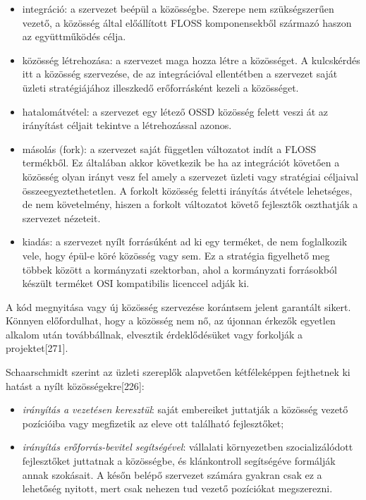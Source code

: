 \documentclass[12pt,magyar,a4paper,oneside]{scrreprt}
\providecommand{\tightlist}{%
  \setlength{\itemsep}{0pt}\setlength{\parskip}{0pt}}
\begin{document}
\begin{itemize}
\tightlist
\item
  integráció: a szervezet beépül a közösségbe. Szerepe nem
  szükségszerűen vezető, a közösség által előállított FLOSS
  komponensekből származó haszon az együttműködés célja.
\item
  közösség létrehozása: a szervezet maga hozza létre a közösséget. A
  kulcskérdés itt a közösség szervezése, de az integrációval ellentétben
  a szervezet saját üzleti stratégiájához illeszkedő erőforrásként
  kezeli a közösséget.
\item
  hatalomátvétel: a szervezet egy létező OSSD közösség felett veszi át
  az irányítást céljait tekintve a létrehozással azonos.
\item
  másolás (fork): a szervezet saját független változatot indít a FLOSS
  termékből. Ez általában akkor következik be ha az integrációt követően
  a közösség olyan irányt vesz fel amely a szervezet üzleti vagy
  stratégiai céljaival összeegyeztethetetlen. A forkolt közösség feletti
  irányítás átvétele lehetséges, de nem követelmény, hiszen a forkolt
  változatot követő fejlesztők oszthatják a szervezet nézeteit.
\item
  kiadás: a szervezet nyílt forrásúként ad ki egy terméket, de nem
  foglalkozik vele, hogy épül-e köré közösség vagy sem. Ez a stratégia
  figyelhető meg többek között a kormányzati szektorban, ahol a
  kormányzati forrásokból készült terméket OSI kompatibilis licenccel
  adják ki.
\end{itemize}

A kód megnyitása vagy új közösség szervezése korántsem jelent garantált
sikert. Könnyen előfordulhat, hogy a közösség nem nő, az újonnan érkezők
egyetlen alkalom után továbbállnak, elvesztik érdeklődésüket vagy
forkolják a projektet{[}271{]}.

Schaarschmidt szerint az üzleti szereplők alapvetően kétféleképpen
fejthetnek ki hatást a nyílt közösségekre{[}226{]}:

\begin{itemize}
\tightlist
\item
  \emph{irányítás a vezetésen keresztül}: saját embereiket juttatják a
  közösség vezető pozícióiba vagy megfizetik az eleve ott található
  fejlesztőket;
\item
  \emph{irányítás erőforrás-bevitel segítségével}: vállalati
  környezetben szocializálódott fejlesztőket juttatnak a közösségbe, és
  klánkontroll segítségéve formálják annak szokásait. A későn belépő
  szervezet számára gyakran csak ez a lehetőség nyitott, mert csak
  nehezen tud vezető pozíciókat megszerezni.
\end{itemize}
\end{document}
